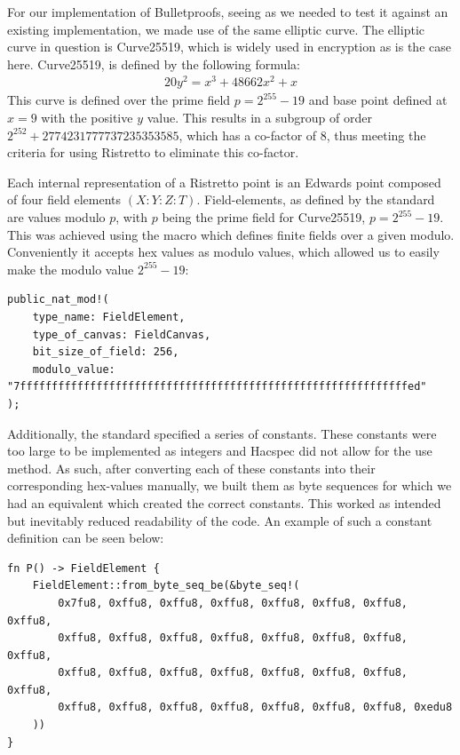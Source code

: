 \documentclass{article}
\newcommand*\ttvar[1]{\texttt{\expandafter\dottvar\detokenize{#1}\relax}}
\newcommand*\dottvar[1]{\ifx\relax#1\else
  \expandafter\ifx\string_#1\string_\allowbreak\else#1\fi
  \expandafter\dottvar\fi}
\newcommand{\eq}[1]{\begin{alignat*}{20}#1\end{alignat*}}
\begin{document}
For our implementation of Bulletproofs, seeing as we needed to test it
against an existing implementation, we made use of the same elliptic
curve. The elliptic curve in question is Curve25519, which is widely
used in encryption as is the case here. Curve25519, is defined by the
following formula:
\eq{
	y^2 = x^3 + 48662x^2 + x
}
This curve is defined over the prime field $p = 2^{255} - 19$ and base
point defined at $x = 9$ with the positive $y$ value. This results
in a subgroup of order $2^{252} + 2774231777737235353585$, which has
a co-factor of $8$, thus meeting the criteria for using Ristretto to
eliminate this co-factor.

Each internal representation of a Ristretto point is an Edwards point
composed of four field elements $(X : Y : Z : T)$. Field-elements,
as defined by the standard are values modulo $p$, with $p$ being the
prime field for Curve25519, $p = 2^{255} - 19$. This was achieved using
the \ttvar{public_nat_mod!()} macro which defines finite fields over
a given modulo. Conveniently it accepts hex values as modulo values,
which allowed us to easily make the modulo value $2^{255} - 19$:

\begin{lstlisting}
public_nat_mod!(
	type_name: FieldElement,
	type_of_canvas: FieldCanvas,
	bit_size_of_field: 256,
	modulo_value: "7fffffffffffffffffffffffffffffffffffffffffffffffffffffffffffffed"
);
\end{lstlisting}

Additionally, the standard specified a series of constants. These
constants were too large to be implemented as integers and Hacspec
did not allow for the use \ttvar{from_hex()} method. As such, after
converting each of these constants into their corresponding hex-values
manually, we built them as byte sequences for which we had an equivalent
\ttvar{from_byte_seq_be()} which created the correct constants. This
worked as intended but inevitably reduced readability of the code. An
example of such a constant definition can be seen below:

\begin{lstlisting}
fn P() -> FieldElement {
	FieldElement::from_byte_seq_be(&byte_seq!(
		0x7fu8, 0xffu8, 0xffu8, 0xffu8, 0xffu8, 0xffu8, 0xffu8, 0xffu8,
		0xffu8, 0xffu8, 0xffu8, 0xffu8, 0xffu8, 0xffu8, 0xffu8, 0xffu8,
		0xffu8, 0xffu8, 0xffu8, 0xffu8, 0xffu8, 0xffu8, 0xffu8, 0xffu8,
		0xffu8, 0xffu8, 0xffu8, 0xffu8, 0xffu8, 0xffu8, 0xffu8, 0xedu8
	))
}
\end{lstlisting}
\end{document}

